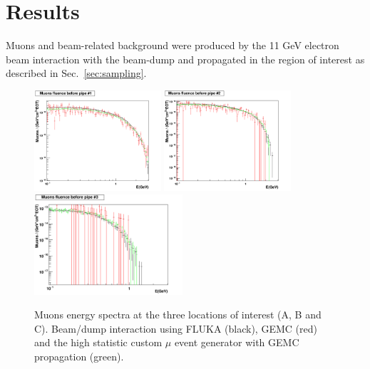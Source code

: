 \section{Results}\label{sec:results}

Muons and beam-related background  were produced by the 11 GeV electron beam interaction with the beam-dump and propagated in the region of interest as described in  Sec.~\ref{sec:sampling}.

\begin{figure}[h!] 
\center
\includegraphics[width=4.7cm]{figs/comparisonMuonsPipe1_1D.pdf}
\includegraphics[width=4.7cm]{figs/comparisonMuonsPipe2_1D.pdf}
\includegraphics[width=5.5cm]{figs/comparisonMuonsPipe3_1D.pdf}
\caption{Muons energy spectra at the three locations of interest (A, B and C). Beam/dump interaction using  FLUKA (black), GEMC (red) and the high statistic custom $\mu$ event generator with GEMC propagation (green).}
\label{fig:mu-comp}
\end{figure}


